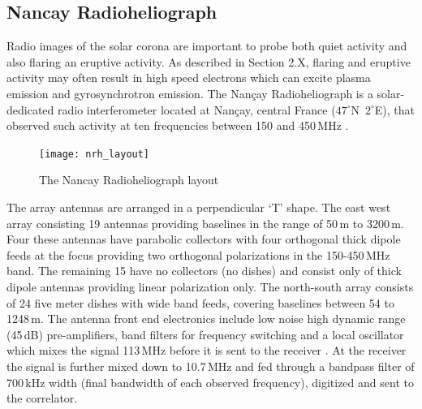 \subsection{Nancay Radioheliograph}\label{sec:33}

Radio images of the solar corona are important to probe both quiet activity and also flaring an eruptive activity. As described in Section 2.X, flaring and eruptive activity may often result in high speed electrons which can excite plasma emission and gyrosynchrotron emission. The Nan\c{c}ay Radioheliograph is a solar-dedicated radio interferometer located at Nan\c{c}ay, central France ($47^{\circ}$N~$2^{\circ}$E), that observed such activity at ten frequencies between 150 and 450\,MHz \citep{kerdraon1997}.
\begin{figure}[t!]
\begin{center}
\texttt{[image: nrh\_layout]}
\caption[The Nancay Radioheliograph layout]{The Nancay Radioheliograph layout}
\end{center}
\label{fig:eclipse}
\end{figure}

The array antennas are arranged in a perpendicular \textquoteleft T' shape. The east west array consisting 19 antennas providing baselines in the range of 50\,m to 3200\,m. Four these antennas have parabolic collectors with four orthogonal thick dipole feeds at the focus providing two orthogonal polarizations in the 150-450\,MHz band. The remaining 15 have no collectors (no dishes) and consist only of thick dipole antennas providing linear polarization only. The north-south array consists of 24 five meter dishes with wide band feeds, covering baselines between 54 to 1248\,m. The antenna front end electronics include low noise high dynamic range (45\,dB) pre-amplifiers, band filters for frequency switching and a local oscillator which mixes the signal 113\,MHz before it is sent to the receiver \citep{avignon1989}. At the receiver the signal is further mixed down to 10.7\,MHz and fed through a bandpass filter of 700\,kHz width (final bandwidth of each observed frequency), digitized and sent to the correlator.


